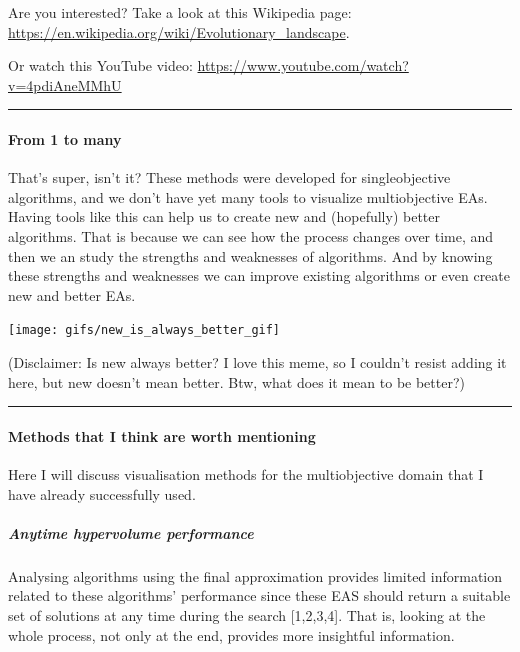 \documentclass[
]{article}
\begin{document}
Are you interested? Take a look at this Wikipedia page:
\url{https://en.wikipedia.org/wiki/Evolutionary_landscape}.

Or watch this YouTube video:
\url{https://www.youtube.com/watch?v=4pdiAneMMhU}

\begin{center}\rule{0.5\linewidth}{0.5pt}\end{center}

\hypertarget{from-1-to-many}{%
\paragraph{From 1 to many}\label{from-1-to-many}}

That's super, isn't it? These methods were developed for singleobjective
algorithms, and we don't have yet many tools to visualize multiobjective
EAs. Having tools like this can help us to create new and (hopefully)
better algorithms. That is because we can see how the process changes
over time, and then we an study the strengths and weaknesses of
algorithms. And by knowing these strengths and weaknesses we can improve
existing algorithms or even create new and better EAs.

\begin{center}\texttt{[image: gifs/new\_is\_always\_better\_gif]} \end{center}

(Disclaimer: Is new always better? I love this meme, so I couldn't
resist adding it here, but new doesn't mean better. Btw, what does it
mean to be better?)

\begin{center}\rule{0.5\linewidth}{0.5pt}\end{center}

\hypertarget{methods-that-i-think-are-worth-mentioning}{%
\paragraph{Methods that I think are worth
mentioning}\label{methods-that-i-think-are-worth-mentioning}}

Here I will discuss visualisation methods for the multiobjective domain
that I have already successfully used.

\hypertarget{anytime-hypervolume-performance}{%
\subparagraph{Anytime hypervolume
performance}\label{anytime-hypervolume-performance}}

Analysing algorithms using the final approximation provides limited
information related to these algorithms' performance since these EAS
should return a suitable set of solutions at any time during the search
{[}1,2,3,4{]}. That is, looking at the whole process, not only at the
end, provides more insightful information.
\end{document}
